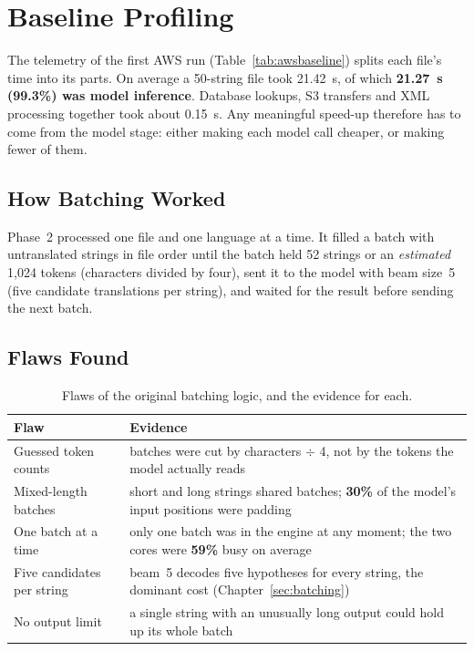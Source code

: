 \section{Baseline Profiling}
\label{sec:profiling}

The telemetry of the first AWS run (Table~\ref{tab:awsbaseline}) splits each file's time into its parts. On average a
50-string file took 21.42~s, of which \textbf{21.27~s (99.3\%) was model inference}. Database lookups, S3 transfers and
XML processing together took about 0.15~s. Any meaningful speed-up therefore has to come from the model stage: either
making each model call cheaper, or making fewer of them.

\subsection{How Batching Worked}
Phase~2 processed one file and one language at a time. It filled a batch with untranslated strings in file order until
the batch held 52 strings or an \emph{estimated} 1,024 tokens (characters divided by four), sent it to the model with
beam size~5 (five candidate translations per string), and waited for the result before sending the next batch.

\subsection{Flaws Found}
\begin{table}[H]
\centering
\caption[Flaws of the original batching]{Flaws of the original batching logic, and the evidence for each.}
\label{tab:flaws}
\begin{tabularx}{\linewidth}{@{}l L@{}}
\toprule
\textbf{Flaw} & \textbf{Evidence} \\
\midrule
Guessed token counts & batches were cut by characters $\div$ 4, not by the tokens the model actually reads \\
Mixed-length batches & short and long strings shared batches; \textbf{30\%} of the model's input positions were padding \\
One batch at a time & only one batch was in the engine at any moment; the two cores were \textbf{59\%} busy on average \\
Five candidates per string & beam~5 decodes five hypotheses for every string, the dominant cost (Chapter~\ref{sec:batching}) \\
No output limit & a single string with an unusually long output could hold up its whole batch \\
\bottomrule
\end{tabularx}
\end{table}

